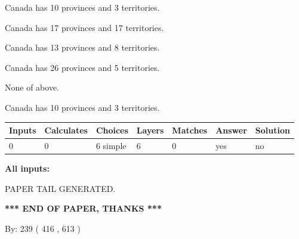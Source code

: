 \documentclass[12pt]{article}
\begin{document}
 
Canada has 10  provinces and 3 territories.
 
 
Canada has  17 provinces and  17 territories.
 
 
Canada has  13 provinces and  8 territories.
 
 
Canada has  26 provinces and  5 territories.
 
 
 None of above.
 
 
\noindent{}
 
 
Canada has 10  provinces and 3 territories.
 
 
\noindent{}
 
 
   
   
   
   
\noindent\begin{tabular}{|l|l|l|l|l|l|l|}
 \hline
Inputs & Calculates & Choices & Layers & Matches & Answer & Solution \\ \hline
 0  & 
 0  & 
 6
  simple  
  & 
 6  & 
 0  & 
  yes & 
  no 
  \\ \hline
 \end{tabular}
   
   
   
   
\noindent{}
   
   
   
   
\noindent\vspace{0.1in}\hspace{-0.08in} {\textbf{\Large{All inputs: }}}
   
   
   
   
   
   
 \vspace{0.2in}
 
   
   
\vspace{2.0in} PAPER TAIL GENERATED.
   
   
   
   
\vspace{1.0in} 
{\textbf{\large{ *** END OF PAPER, THANKS *** }}} 
   
   
\hspace{1.0in} By: 
 239 ( 416 ,  613 )
   
\end{document}
